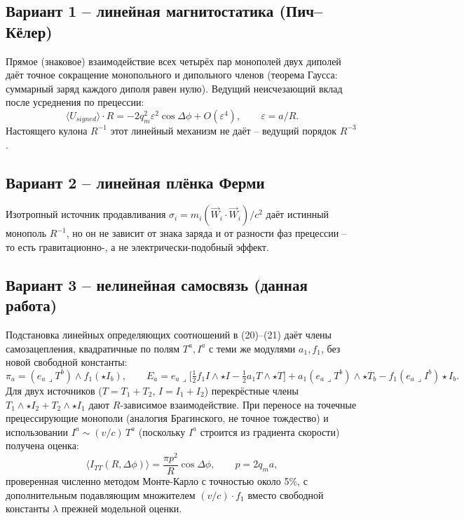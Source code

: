\documentclass[12pt,a4paper]{article}
\begin{document}
\subsection{Вариант 1 -- линейная магнитостатика (Пич--Кёлер)}

Прямое (знаковое) взаимодействие всех четырёх пар монополей двух
диполей даёт точное сокращение монопольного и дипольного членов
(теорема Гаусса: суммарный заряд каждого диполя равен нулю). Ведущий
неисчезающий вклад после усреднения по прецессии:
\begin{equation}
\langle U_{signed}\rangle\cdot R = -2q_m^2\varepsilon^2\cos\Delta\phi
+O(\varepsilon^4),\qquad \varepsilon=a/R.
\end{equation}
Настоящего кулона $R^{-1}$ этот линейный механизм не даёт --
ведущий порядок $R^{-3}$.

\subsection{Вариант 2 -- линейная плёнка Ферми}

Изотропный источник продавливания $\sigma_i=m_i(\vec W_i\cdot\vec
W_i)/c^2$ даёт истинный монополь $R^{-1}$, но он не зависит от знака
заряда и от разности фаз прецессии -- то есть гравитационно-, а не
электрически-подобный эффект.

\subsection{Вариант 3 -- нелинейная самосвязь (данная работа)}

Подстановка линейных определяющих соотношений в (20)--(21) даёт члены
самозацепления, квадратичные по полям $T^a,I^a$ с теми же модулями
$a_1,f_1$, без новой свободной константы:
\begin{equation}
\pi_a=(e_a\lrcorner T^b)\wedge f_1(\star I_b),\qquad
E_a = e_a\lrcorner\Big[\tfrac12 f_1 I\wedge\star I-\tfrac12 a_1 T\wedge\star T\Big]
+a_1(e_a\lrcorner T^b)\wedge\star T_b - f_1(e_a\lrcorner I^b)\star I_b.
\end{equation}
Для двух источников ($T=T_1+T_2$, $I=I_1+I_2$) перекрёстные члены
$T_1\wedge\star I_2+T_2\wedge\star I_1$ дают $R$-зависимое
взаимодействие. При переносе на точечные прецессирующие монополи
(аналогия Брагинского, не точное тождество) и использовании
$I^a\sim (v/c)\,T^a$ (поскольку $I^a$ строится из градиента скорости)
получена оценка:
\begin{equation}
\langle I_{TT}(R,\Delta\phi)\rangle = \frac{\pi p^2}{R}\cos\Delta\phi,
\qquad p=2q_m a,
\end{equation}
проверенная численно методом Монте-Карло с точностью около 5\%, с
дополнительным подавляющим множителем $(v/c)\cdot f_1$ вместо
свободной константы $\lambda$ прежней модельной оценки.
\end{document}
